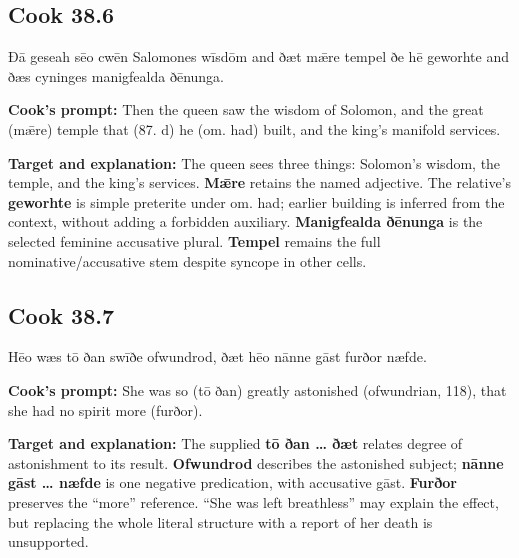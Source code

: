 \par\begin{minipage}{\linewidth}\raggedright
\subsection*{Cook 38.6}

Ðā geseah sēo cwēn Salomones wīsdōm and ðæt mǣre tempel ðe hē geworhte and ðæs cyninges manigfealda ðēnunga.

\textbf{Cook's prompt:} Then the queen saw the wisdom of Solomon, and the great (mǣre) temple that (87. d) he (om. had) built, and the king’s manifold services.

\textbf{Target and explanation:} The queen sees three things: Solomon's wisdom, the temple, and the king's services. \textbf{Mǣre} retains the named adjective. The relative's \textbf{geworhte} is simple preterite under om. had; earlier building is inferred from the context, without adding a forbidden auxiliary. \textbf{Manigfealda ðēnunga} is the selected feminine accusative plural. \textbf{Tempel} remains the full nominative/\allowbreak{}accusative stem despite syncope in other cells.

\end{minipage}\par\addvspace{4pt}

\par\begin{minipage}{\linewidth}\raggedright
\subsection*{Cook 38.7}

Hēo wæs tō ðan swīðe ofwundrod, ðæt hēo nānne gāst furðor næfde.

\textbf{Cook's prompt:} She was so (tō ðan) greatly astonished (ofwundrian, 118), that she had no spirit more (furðor).

\textbf{Target and explanation:} The supplied \textbf{tō ðan … ðæt} relates degree of astonishment to its result. \textbf{Ofwundrod} describes the astonished subject; \textbf{nānne gāst … næfde} is one negative predication, with accusative gāst. \textbf{Furðor} preserves the “more” reference. “She was left breathless” may explain the effect, but replacing the whole literal structure with a report of her death is unsupported.

\end{minipage}\par\addvspace{4pt}

